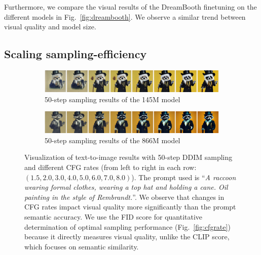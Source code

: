 
Furthermore, we compare the visual results of the DreamBooth finetuning on the different models in Fig.~\ref{fig:dreambooth}. We observe a similar trend between  visual quality and  model size.


\subsection{Scaling sampling-efficiency}

\begin{figure}[!t]
    \centering
    \begin{subfigure}[b]{\linewidth}
    \includegraphics[width=\linewidth]{cp2/figures/145M_cfg.jpg}
    \caption{50-step sampling results of the 145M model}
    \end{subfigure}
    \begin{subfigure}[b]{\linewidth}
    \includegraphics[width=\linewidth]{cp2/figures/866M_cfg.jpg}
    \caption{50-step sampling results of the 866M model}
    \end{subfigure}
    \caption{Visualization of text-to-image results with 50-step DDIM sampling and different CFG rates (from left to right in each row: $(1.5, 2.0, 3.0, 4.0, 5.0, 6.0, 7.0, 8.0)$). The prompt used is ``\emph{A raccoon wearing formal clothes, wearing a top hat and holding a cane. Oil painting in the style of Rembrandt.}''.
    We observe that changes in CFG rates impact visual quality more significantly than the prompt semantic accuracy.
    We use the FID score for quantitative determination of optimal sampling performance (Fig.~\ref{fig:cfgrate}) because it directly measures visual quality, unlike the CLIP score, which focuses on semantic similarity. }
    \label{fig:cfgratevisual}
    \vspace{-1\baselineskip}
\end{figure}

